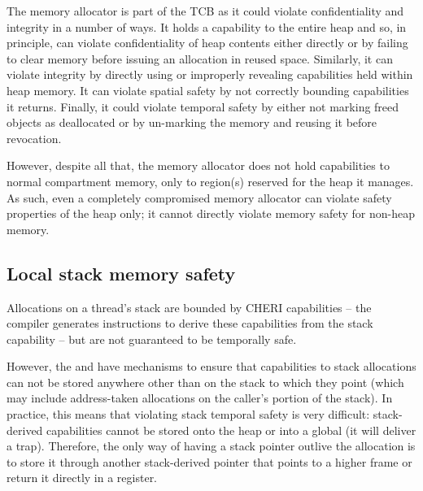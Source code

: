 The memory allocator is part of the TCB as it could violate confidentiality and integrity in a number of ways.
It holds a capability to the entire heap and so, in principle, can violate confidentiality of heap contents either directly or by failing to clear memory before issuing an allocation in reused space.
Similarly, it can violate integrity by directly using or improperly revealing capabilities held within heap memory.
It can violate spatial safety by not correctly bounding capabilities it returns.
Finally, it could violate temporal safety by either not marking freed objects as deallocated or by un-marking the memory and reusing it before revocation.

However, despite all that, the memory allocator does not hold capabilities to normal compartment memory, only to region(s) reserved for the heap it manages.
As such, even a completely compromised memory allocator can violate safety properties of the heap only; it cannot directly violate memory safety for non-heap memory.

\subsection{Local stack memory safety}

Allocations on a thread's stack are bounded by CHERI capabilities -- the compiler generates instructions to derive these capabilities from the stack capability -- but are not guaranteed to be temporally safe.

However, the \cherimcuisa{} and \cherimcuos{} have mechanisms to ensure that capabilities to stack allocations can not be stored anywhere other than on the stack to which they point (which may include address-taken allocations on the caller's portion of the stack).
In practice, this means that violating stack temporal safety is very difficult: stack-derived capabilities cannot be stored onto the heap or into a global (it will deliver a trap).
Therefore, the only way of having a stack pointer outlive the allocation is to store it through another stack-derived pointer that points to a higher frame or return it directly in a register.


